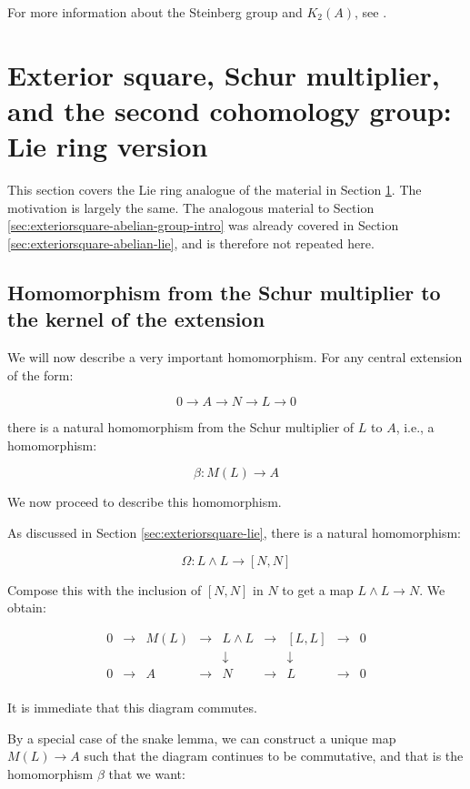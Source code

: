 For more information about the Steinberg group and $K_2(A)$, see
\cite{MilnorKTheory}.

\section{Exterior square, Schur multiplier, and the second cohomology group: Lie ring version}\label{sec:schur-multiplier-and-second-cohomology-lie}

This section covers the Lie ring analogue of the material in Section
\ref{sec:schur-multiplier-and-second-cohomology-lie}. The motivation
is largely the same. The analogous material to Section
\ref{sec:exteriorsquare-abelian-group-intro} was already covered in
Section \ref{sec:exteriorsquare-abelian-lie}, and is therefore not
repeated here.

\subsection{Homomorphism from the Schur multiplier to the kernel of the extension}\label{sec:homschurkernel-lie}

We will now describe a very important homomorphism. For any central extension of the form:

$$0 \to A \to N \to L \to 0$$

there is a natural homomorphism from the Schur multiplier of $L$ to $A$, i.e., a homomorphism:

$$\beta: M(L) \to A$$

We now proceed to describe this homomorphism.

As discussed in Section \ref{sec:exteriorsquare-lie}, there is a natural
homomorphism:

$$\Omega: L \wedge L \to [N,N]$$

Compose this with the inclusion of $[N,N]$ in $N$ to get a map $L
\wedge L \to N$. We obtain:

$$\begin{array}{ccccccccc}
0 & \to & M(L) & \to & L \wedge L & \to & [L,L] & \to & 0\\
&&               && \downarrow     &&\downarrow&&\\
0 & \to & A & \to & N & \to & L & \to & 0\\
\end{array}$$

It is immediate that this diagram commutes.

By a special case of the snake lemma, we can construct a unique map
$M(L) \to A$ such that the diagram continues to be commutative, and
that is the homomorphism $\beta$ that we want:

